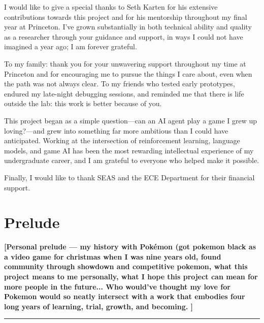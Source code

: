 I would like to give a special thanks to Seth Karten for his extensive contributions towards this project and for his mentorship throughout my final year at Princeton. I've grown substantially in both technical ability and quality as a researcher through your guidance and support, in ways I could not have imagined a year ago; I am forever grateful.


To my family: thank you for your unwavering support throughout my time at Princeton and for encouraging me to pursue the things I care about, even when the path was not always clear. To my friends who tested early prototypes, endured my late-night debugging sessions, and reminded me that there is life outside the lab: this work is better because of you.

This project began as a simple question---can an AI agent play a game I grew up loving?---and grew into something far more ambitious than I could have anticipated. Working at the intersection of reinforcement learning, language models, and game AI has been the most rewarding intellectual experience of my undergraduate career, and I am grateful to everyone who helped make it possible.

Finally, I would like to thank SEAS and the ECE Department for their financial support.

\newpage


\tableofcontents

\newpage


\section*{Prelude}

\textbf{[Personal prelude --- my history with Pok\'{e}mon (got pokemon black as a video game for christmas when I was nine years old, found community through showdown and competitive pokemon, what this project means to me personally, what I hope this project can mean for more people in the future... Who would've thought my love for Pokemon would so neatly intersect with a work that embodies four long years of learning, trial, growth, and becoming. ]}

\vspace{2em}
\noindent\rule{\textwidth}{0.4pt}

\newpage
